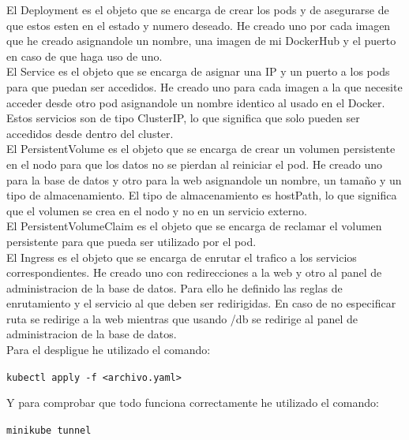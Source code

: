 \documentclass{report}
\begin{document}
            El Deployment es el objeto que se encarga de crear los pods y de asegurarse de que estos esten en el estado y numero deseado.
            He creado uno por cada imagen que he creado asignandole un nombre, una imagen de mi DockerHub y el puerto en caso de que haga uso de uno.\\

            El Service es el objeto que se encarga de asignar una IP y un puerto a los pods para que puedan ser accedidos.
            He creado uno para cada imagen a la que necesite acceder desde otro pod asignandole un nombre identico al usado en el Docker.
            Estos servicios son de tipo ClusterIP, lo que significa que solo pueden ser accedidos desde dentro del cluster.\\

            El PersistentVolume es el objeto que se encarga de crear un volumen persistente en el nodo para que los datos no se pierdan al reiniciar el pod.
            He creado uno para la base de datos y otro para la web asignandole un nombre, un tamaño y un tipo de almacenamiento.
            El tipo de almacenamiento es hostPath, lo que significa que el volumen se crea en el nodo y no en un servicio externo.\\

            El PersistentVolumeClaim es el objeto que se encarga de reclamar el volumen persistente para que pueda ser utilizado por el pod.\\

            El Ingress es el objeto que se encarga de enrutar el trafico a los servicios correspondientes.
            He creado uno con redirecciones a la web y otro al panel de administracion de la base de datos.
            Para ello he definido las reglas de enrutamiento y el servicio al que deben ser redirigidas.
            En caso de no especificar ruta se redirige a la web mientras que usando /db se redirige al panel de administracion de la base de datos.\\

            Para el despligue he utilizado el comando:
            \begin{center}
                \texttt{kubectl apply -f <archivo.yaml>}
            \end{center}

            Y para comprobar que todo funciona correctamente he utilizado el comando:
            \begin{center}
                \texttt{minikube tunnel}
            \end{center}
        \clearpage
\end{document}
